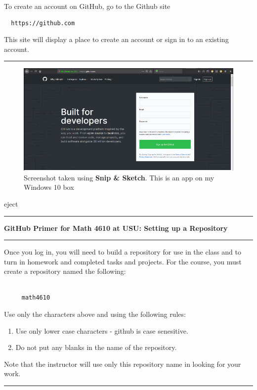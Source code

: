 \documentclass[10pt,fleqn]{article}
\begin{document}
To create an account on GitHub, go to the Github site
\begin{verbatim}
  https://github.com
\end{verbatim}
This site will display a place to create an account or sign in to an existing
account.
\vskip0.1in\hrule\vskip0.1in
\vfill
\begin{figure}[h]
\centering
\includegraphics[width=5in]{../images/github_01.png}
\vskip0.1in
\caption{{Screenshot} taken using {\bf Snip \& Sketch}. This is an app on
         my Windows 10 box}
\end{figure}
eject
\vskip0.1in\hrule\vskip0.1in
{\bf{\large
  GitHub Primer for Math 4610 at USU: Setting up a Repository 
}}
\vskip0.1in\hrule\vskip0.1in
Once you log in, you will need to build a repository for use in the class and
to turn in homework and completed tasks and projects. For the course, you must
create a repository named the following:
\begin{verbatim}

     math4610

\end{verbatim}
Use only the characters above and using the following rules:
\begin{enumerate}
  \item Use only lower case characters - github is case senesitive.
  \item Do not put any blanks in the name of the repository.
\end{enumerate}
Note that the instructor will use only this repository name in looking for your
work.
\vskip0.1in\hrule\vskip0.1in
\vfill
\end{document}
